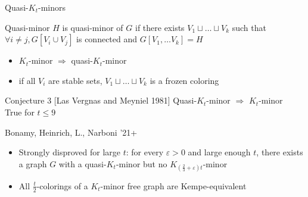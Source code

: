 \documentclass[11pt,xcolor=dvipsnames,presentation]{beamer}
\newcommand{\backupend}{
   \setcounter{framenumber}{\value{finalframe}}
}
\begin{document}
\begin{frame}{Quasi-$K_t$-minors}
  \begin{exampleblock}{Quasi-minor}
    $H$ is quasi-minor of $G$ if there exists $V_1 \sqcup \dots \sqcup V_k$ such
    that $\forall i \neq j, G[V_i \cup V_j]$ is connected and $G[V_1, \dots V_k] = H$
    \begin{itemize}
    \item $K_t$-minor $\Rightarrow$ quasi-$K_t$-minor
    \item if all $V_i$ are stable sets, $V_1 \sqcup \dots \sqcup V_k$ is a frozen coloring 
    \end{itemize}
  \end{exampleblock}


  \pause
  \begin{alertblock}{Conjecture 3 [Las Vergnas and Meyniel 1981]}
    Quasi-$K_t$-minor $\Rightarrow$ $K_t$-minor\\
    True for $t \le 9$
  \end{alertblock}
  \pause
  \begin{block}{Bonamy, Heinrich, L., Narboni '21+}
    \begin{itemize}
    \item Strongly disproved for large $t$: for every $\varepsilon >0$ and large
      enough $t$, there exists a graph $G$ with a quasi-$K_t$-minor but no
      $K_{\left(\frac{2}{3} + \varepsilon\right)t}$-minor
      \pause
    \item All $\frac{t}{2}$-colorings of a $K_t$-minor free graph are
      Kempe-equivalent
    \end{itemize}
  \end{block}
\end{frame}

\backupend


\end{document}
